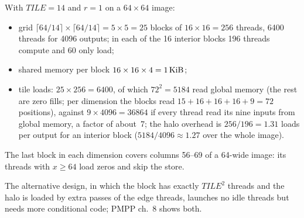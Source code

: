 \documentclass[../main.tex]{subfiles}
\begin{document}
\begin{example}
  \label{ex:l03-stencil-count}
  With $\mathit{TILE}=14$ and $r=1$ on a $64\times64$ image:
  \begin{itemize}
    \item grid $\lceil 64/14 \rceil \times \lceil 64/14 \rceil = 5\times5
      = 25$ blocks of $16\times16 = 256$ threads, \num{6400} threads for
      \num{4096} outputs; in each of the 16 interior blocks 196 threads
      compute and 60 only load;
    \item shared memory per block $16 \times 16 \times 4 =
      \SI{1}{\kibi\byte}$;
    \item tile loads: $25 \times 256 = \num{6400}$, of which
      $72^2 = \num{5184}$ read global memory (the rest are zero fills;
      per dimension the blocks read $15+16+16+16+9 = 72$ positions),
      against $9 \times \num{4096} = \num{36864}$ if every thread read its
      nine inputs from global memory, a factor of about~7; the halo
      overhead is $256/196 = 1.31$ loads per output for an interior block
      ($\num{5184}/\num{4096} \approx 1.27$ over the whole image).
  \end{itemize}
  The last block in each dimension covers columns 56--69 of a 64-wide
  image: its threads with $x \ge 64$ load zeros and skip the store.
\end{example}


The alternative design, in which the block has exactly $\mathit{TILE}^2$
threads and the halo is loaded by extra passes of the edge threads,
launches no idle threads but needs more conditional code; PMPP ch.~8
shows both.
\end{document}
